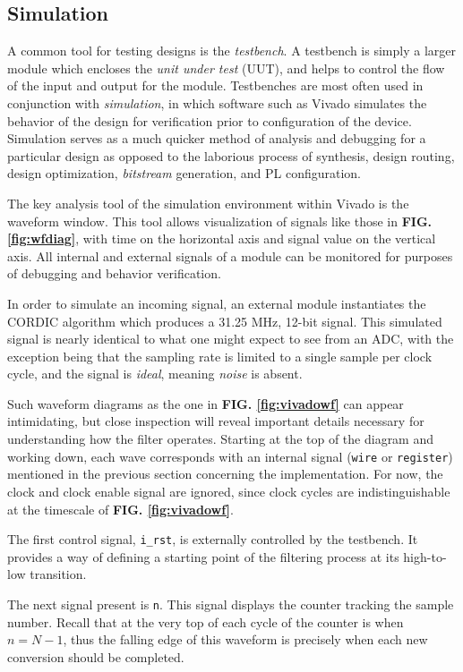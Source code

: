 \documentclass[reprint,amsmath,amssymb,aps,pra]{revtex4-2}
\begin{document}
\subsection{Simulation}

A common tool for testing designs is the \textit{testbench}. A testbench is simply a larger module which encloses the \textit{unit under test} (UUT), and helps to control the flow of the input and output for the module. Testbenches are most often used in conjunction with \textit{simulation}, in which software such as Vivado simulates the behavior of the design for verification prior to configuration of the device. Simulation serves as a much quicker method of analysis and debugging for a particular design as opposed to the laborious process of synthesis, design routing, design optimization, \textit{bitstream} generation, and PL configuration.

The key analysis tool of the simulation environment within Vivado is the waveform window. This tool allows visualization of signals like those in \textbf{FIG. \ref{fig:wfdiag}}, with time on the horizontal axis and signal value on the vertical axis. All internal and external signals of a module can be monitored for purposes of debugging and behavior verification.

In order to simulate an incoming signal, an external module instantiates the CORDIC algorithm which produces a 31.25 MHz, 12-bit signal. This simulated signal is nearly identical to what one might expect to see from an ADC, with the exception being that the sampling rate is limited to a single sample per clock cycle, and the signal is \textit{ideal}, meaning \textit{noise} is absent.

 Such waveform diagrams as the one in \textbf{FIG. \ref{fig:vivadowf}} can appear intimidating, but close inspection will reveal important details necessary for understanding how the filter operates. Starting at the top of the diagram and working down, each wave corresponds with an internal signal (\verb+wire+ or \verb+register+) mentioned in the previous section concerning the implementation. For now, the clock and clock enable signal are ignored, since clock cycles are indistinguishable at the timescale of \textbf{FIG. \ref{fig:vivadowf}}. 
 
 The first control signal, \verb+i_rst+, is externally controlled by the testbench. It provides a way of defining a starting point of the filtering process at its high-to-low transition.

 The next signal present is \verb+n+. This signal displays the counter tracking the sample number. Recall that at the very top of each cycle of the counter is when $n = N-1$, thus the falling edge of this waveform is precisely when each new conversion should be completed.
\end{document}
